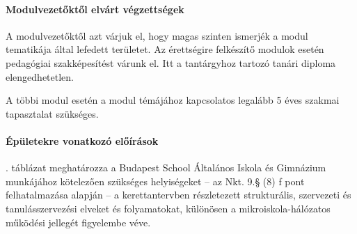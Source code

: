 \paragraph{Modulvezetőktől elvárt végzettségek}
A modulvezetőktől azt várjuk el, hogy magas szinten ismerjék a modul tematikája
által lefedett területet. Az érettségire
felkészítő modulok esetén pedagógiai szakképesítést várunk el. Itt a
tantárgyhoz tartozó tanári diploma
elengedhetetlen.

A többi modul esetén a modul témájához kapcsolatos legalább 5 éves szakmai
tapasztalat szükséges.

\paragraph{Épületekre vonatkozó előírások}
. táblázat meghatározza a Budapest School Általános Iskola
és Gimnázium munkájához kötelezően szükséges helyiségeket -- az Nkt. 9.§ (8) f
pont felhatalmazása alapján -- a kerettantervben részletezett strukturális,
szervezeti és tanulásszervezési elveket és folyamatokat, különösen a
mikroiskola-hálózatos működési jellegét figyelembe véve.

